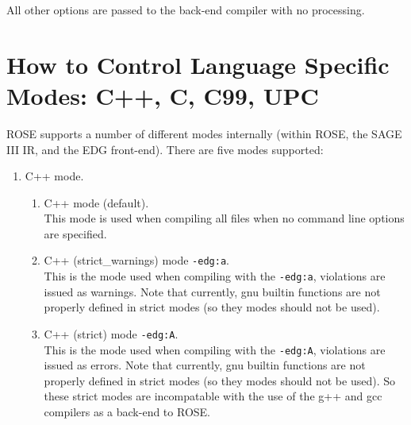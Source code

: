      All other options are passed to the back-end compiler with no processing.


\section{How to Control Language Specific Modes: C++, C, C99, UPC}

   ROSE supports a number of different modes internally (within ROSE, the SAGE III
IR, and the EDG front-end).  There are five modes supported:
\begin{enumerate}
   \item C++ mode. \\
   \begin{enumerate}
      \item C++ mode (default). \\
        This mode is used when compiling all files when no command line options are specified.
      \item C++ (strict\_warnings) mode {\tt -edg:a}. \\
        This is the mode used when compiling with the {\tt -edg:a}, violations are issued
        as warnings. Note that currently, gnu builtin functions
        are not properly defined in strict modes (so they modes should not be used).
      \item C++ (strict) mode {\tt -edg:A}. \\
        This is the mode used when compiling with the {\tt -edg:A}, violations are issued
        as errors. Note that currently, gnu builtin functions
        are not properly defined in strict modes (so they modes should not be used).
        So these strict modes are incompatable with the use of the g++ and gcc compilers
        as a back-end to ROSE.
   \end{enumerate}


\end{enumerate}
